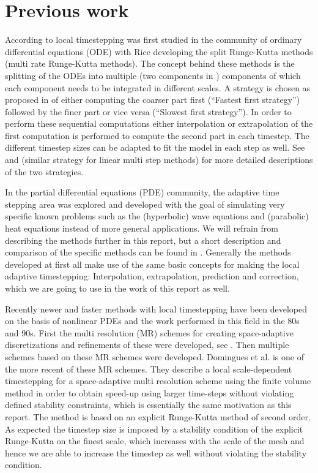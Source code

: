 \documentclass[11pt]{article}
\begin{document}

\section{Previous work}
According to \cite{Gander:2013} local timestepping
was first studied in the community of ordinary differential equations (ODE)
with Rice \cite{rice:1960} developing the split Runge-Kutta methods (multi
rate Runge-Kutta methods). The concept behind these methods is the splitting
of the ODEs into multiple (two components in \cite{rice:1960}) components of
which each component needs to be integrated in different scales. A strategy
is chosen as proposed in \cite{Kvaernoe:1999} of either computing the coarser
part first (``Fastest first strategy'') followed by the finer part or vice
versa (``Slowest first strategy''). In order to perform these sequential
computations either interpolation or extrapolation of the first computation
is performed to compute the second part in each timestep. The different
timestep sizes can be adapted to fit the model in each step as well. See
\cite{Kvaernoe:1999} and \cite{Gear:1984} (similar strategy for linear multi
step methods) for more detailed descriptions of the two strategies.

In the partial differential equations (PDE) community, the adaptive time
stepping area was explored and developed with the goal of simulating
very specific known problems such as the (hyperbolic) wave equations
and (parabolic) heat equations instead of more general applications. We
will refrain from describing the methods further in this report, but a
short description and comparison of the specific methods can be found in
\cite{Gander:2013}. Generally the methods developed at first all make use
of the same basic concepts for making the local adaptive timestepping:
Interpolation, extrapolation, prediction and correction, which we are going to
use in the work of this report as well.

Recently newer and faster methods with local timestepping have been developed
on the basis of nonlinear PDEs and the work performed in this field in
the 80s and 90s. First the multi resolution (MR) schemes for creating
space-adaptive discretizations and refinements of these were developed, see
\cite{Berger:1984}. Then multiple schemes based on these MR schemes were
developed. Domingues
et al. \cite{Domingues:2008} is one of the more recent of these MR schemes.
They describe a local scale-dependent timestepping for a space-adaptive multi
resolution scheme using the finite volume method in order to obtain speed-up
using larger time-steps without violating defined stability constraints,
which is essentially the same motivation as this report. The method is based
on an explicit Runge-Kutta method of second order. As expected the timestep
size is imposed by a stability condition of the explicit Runge-Kutta on the
finest scale, which increases with the scale of the mesh and hence we are able
to increase the timestep as well without violating the stability condition.
\end{document}

